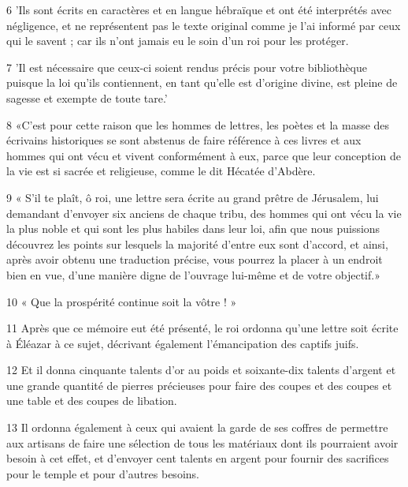 \par 6 'Ils sont écrits en caractères et en langue hébraïque et ont été interprétés avec négligence, et ne représentent pas le texte original comme je l'ai informé par ceux qui le savent ; car ils n'ont jamais eu le soin d'un roi pour les protéger.

\par 7 'Il est nécessaire que ceux-ci soient rendus précis pour votre bibliothèque puisque la loi qu'ils contiennent, en tant qu'elle est d'origine divine, est pleine de sagesse et exempte de toute tare.'

\par 8 «C'est pour cette raison que les hommes de lettres, les poètes et la masse des écrivains historiques se sont abstenus de faire référence à ces livres et aux hommes qui ont vécu et vivent conformément à eux, parce que leur conception de la vie est si sacrée et religieuse, comme le dit Hécatée d'Abdère.

\par 9 « S'il te plaît, ô roi, une lettre sera écrite au grand prêtre de Jérusalem, lui demandant d'envoyer six anciens de chaque tribu, des hommes qui ont vécu la vie la plus noble et qui sont les plus habiles dans leur loi, afin que nous puissions découvrez les points sur lesquels la majorité d'entre eux sont d'accord, et ainsi, après avoir obtenu une traduction précise, vous pourrez la placer à un endroit bien en vue, d'une manière digne de l'ouvrage lui-même et de votre objectif.»

\par 10 « Que la prospérité continue soit la vôtre ! »

\par 11 Après que ce mémoire eut été présenté, le roi ordonna qu'une lettre soit écrite à Éléazar à ce sujet, décrivant également l'émancipation des captifs juifs.

\par 12 Et il donna cinquante talents d'or au poids et soixante-dix talents d'argent et une grande quantité de pierres précieuses pour faire des coupes et des coupes et une table et des coupes de libation.

\par 13 Il ordonna également à ceux qui avaient la garde de ses coffres de permettre aux artisans de faire une sélection de tous les matériaux dont ils pourraient avoir besoin à cet effet, et d'envoyer cent talents en argent pour fournir des sacrifices pour le temple et pour d'autres besoins.

